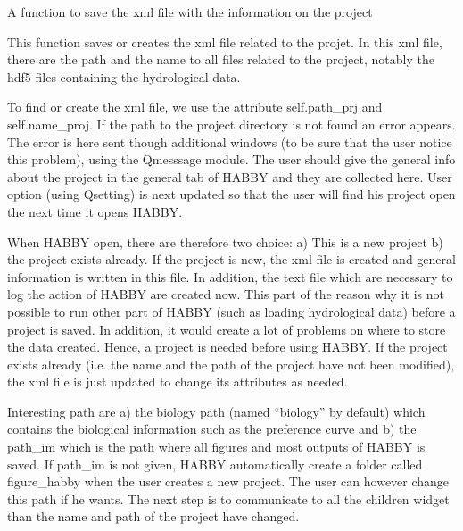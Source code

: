 \documentclass[letterpaper,10pt,english]{sphinxmanual}
\begin{document}
\begin{fulllineitems}
\begin{fulllineitems}
\end{fulllineitems}


\begin{fulllineitems}
\label{\detokenize{index:src_GUI.Main_windows_1.MainWindows.save_project}}
A function to save the xml file with the information on the project


This function saves or creates the xml file related to the projet. In this xml file, there are the path and
the name to all files related to the project, notably the hdf5 files containing the hydrological data.

To find or create the xml file, we use the attribute self.path\_prj and self.name\_proj. If the path to
the project directory is not found an error appears. The error is here sent though additional windows
(to be sure that the user notice this problem), using the Qmesssage module. The user should give the general
info about the project in the general tab of HABBY and they are collected here. User option (using Qsetting)
is next updated so that the user will find his project open the next time it opens HABBY.

When HABBY open, there are therefore  two choice: a) This is a new project b) the project exists already.
If the project is new, the xml file is created and general information is written in this file. In addition,
the text file which are necessary to log the action of HABBY are created now. This part of the reason why it
is not possible to run other part of HABBY (such as loading hydrological data) before a project is saved.
In addition, it would create a lot of problems on where to store the data created. Hence, a project is needed
before using HABBY. If the project exists already (i.e. the name and the path of the project have not been
modified), the xml file is just updated to change its attributes as needed.

Interesting path are a) the biology path (named ``biology'' by default) which contains the biological information
such as the preference curve and b) the path\_im which is the path where all figures and most outputs of HABBY
is saved. If path\_im is not given, HABBY automatically create a folder called figure\_habby when the
user creates a new project. The user can however change this path if he wants. The next step is to communicate
to all the children widget than the name and path of the project have changed.


\end{fulllineitems}
\end{fulllineitems}
\end{document}
